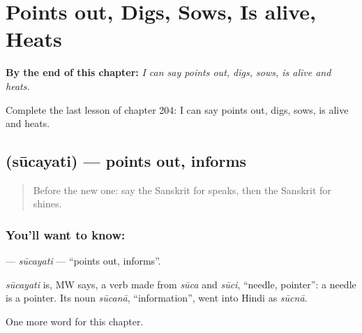 
\chapter{Points out, Digs, Sows, Is alive, Heats}
\label{ch:sa-points-out-digs-sows-is-alive-heats}

\begin{chapteropening}
\textbf{By the end of this chapter:} \emph{I can say points out, digs, sows, is alive and heats.}

Complete the last lesson of chapter 204: I can say points out, digs, sows, is alive and heats.
\end{chapteropening}

\section[\texorpdfstring{\sk{सूचयति} (sūcayati)}{सूचयति (sūcayati)}]{ (sūcayati) — points out, informs}

\label{lesson:SA-C204-sucayati}



\begin{quote}
Before the new one: say the Sanskrit for speaks, then the Sanskrit for shines.
\end{quote}

\subsection*{You'll want to know: }
\textbf{} — \emph{sūcayati} — \textquotedblleft{}points out, informs\textquotedblright{}.

\begin{cousinweb}
\emph{sūcayati} is, MW says, a verb made from \emph{sūca} and \emph{sūci}, \textquotedblleft{}needle, pointer\textquotedblright{}: a needle is a pointer. Its noun \emph{sūcanā}, \textquotedblleft{}information\textquotedblright{}, went into Hindi as \emph{sūcnā}.
\end{cousinweb}

\begin{grammarlens}[title={What you've built}]
One more word for this chapter.
\end{grammarlens}

